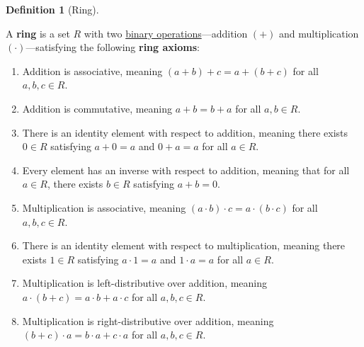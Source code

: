 \documentclass{scrartcl}
\theoremstyle{definition}
\newtheorem{definition}{Definition}[section]
\theoremstyle{plain}
\theoremstyle{remark}
\begin{document}
\begin{definition}[Ring]
    \label{def:ring}

    A \textbf{ring} is a set $R$ with two \hyperref[def:binary operation]{binary operations}---addition $(+)$ and
    multiplication $(\cdot)$---satisfying the following \textbf{ring axioms}:
    \begin{enumerate}
        \item Addition is associative, meaning $(a+b)+c=a+(b+c)$ for all $a,b,c\in R$.
        \item Addition is commutative, meaning $a+b=b+a$ for all $a,b\in R$.

        \item
            There is an identity element with respect to addition, meaning there exists $0\in R$ satisfying $a+0=a$ and
            $0+a=a$ for all $a\in R$.

        \item
            Every element has an inverse with respect to addition, meaning that for all $a\in R$, there exists $b\in R$
            satisfying $a+b=0$.

        \item Multiplication is associative, meaning $(a\cdot b)\cdot c=a\cdot (b\cdot c)$ for all $a,b,c\in R$.

        \item
            There is an identity element with respect to multiplication, meaning there exists $1\in R$ satisfying
            $a\cdot 1=a$ and $1\cdot a=a$ for all $a\in R$.

        \item
            Multiplication is left-distributive over addition, meaning $a\cdot (b+c)=a\cdot b+a\cdot c$ for all
            $a,b,c\in R$.

        \item
            Multiplication is right-distributive over addition, meaning $(b+c)\cdot a=b\cdot a+c\cdot a$ for all
            $a,b,c\in R$.
    \end{enumerate}
\end{definition}
\end{document}
